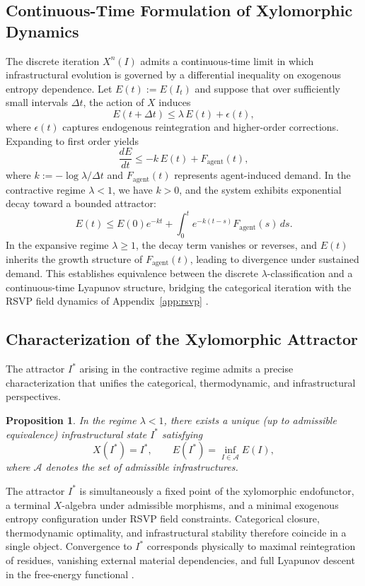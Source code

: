 \documentclass[11pt,a4paper]{article}
\theoremstyle{plain}
\newtheorem{proposition}[theorem]{Proposition}
\theoremstyle{definition}
\theoremstyle{remark}
\begin{document}
\subsection{Continuous-Time Formulation of Xylomorphic Dynamics}

The discrete iteration $X^n(I)$ admits a continuous-time limit in which
infrastructural evolution is governed by a differential inequality on exogenous
entropy dependence. Let $E(t) := E(I_t)$ and suppose that over sufficiently
small intervals $\Delta t$, the action of $X$ induces
\[
  E(t + \Delta t) \leq \lambda\,E(t) + \epsilon(t),
\]
where $\epsilon(t)$ captures endogenous reintegration and higher-order
corrections. Expanding to first order yields
\[
  \frac{dE}{dt} \leq -k\,E(t) + F_{\mathrm{agent}}(t),
\]
where $k := -\log\lambda / \Delta t$ and $F_{\mathrm{agent}}(t)$ represents
agent-induced demand. In the contractive regime $\lambda < 1$, we have $k > 0$,
and the system exhibits exponential decay toward a bounded attractor:
\[
  E(t) \leq E(0)e^{-kt}
  + \int_0^t e^{-k(t-s)} F_{\mathrm{agent}}(s)\,ds.
\]
In the expansive regime $\lambda \geq 1$, the decay term vanishes or reverses,
and $E(t)$ inherits the growth structure of $F_{\mathrm{agent}}(t)$, leading to
divergence under sustained demand. This establishes equivalence between the
discrete $\lambda$-classification and a continuous-time Lyapunov structure,
bridging the categorical iteration with the RSVP field dynamics of
Appendix~\ref{app:rsvp} \citep{risken1989,villani2009}.

\subsection{Characterization of the Xylomorphic Attractor}

The attractor $I^*$ arising in the contractive regime admits a precise
characterization that unifies the categorical, thermodynamic, and
infrastructural perspectives.

\begin{proposition}
\label{prop:attractor}
In the regime $\lambda < 1$, there exists a unique (up to admissible
equivalence) infrastructural state $I^*$ satisfying
\[
  X(I^*) = I^*, \qquad E(I^*) = \inf_{I \in \mathcal{A}} E(I),
\]
where $\mathcal{A}$ denotes the set of admissible infrastructures.
\end{proposition}

The attractor $I^*$ is simultaneously a fixed point of the xylomorphic
endofunctor, a terminal $X$-algebra under admissible morphisms, and a minimal
exogenous entropy configuration under RSVP field constraints. Categorical
closure, thermodynamic optimality, and infrastructural stability therefore
coincide in a single object. Convergence to $I^*$ corresponds physically to
maximal reintegration of residues, vanishing external material dependencies, and
full Lyapunov descent in the free-energy functional \citep{friston2010,parr2022}.
\end{document}
